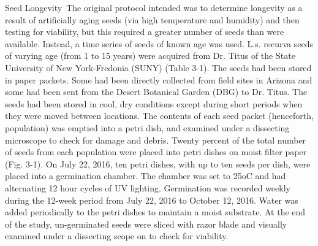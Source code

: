 \documentclass[multicol]{elsarticle}
\begin{document}
\begin{multicols}{2}
\begin{subsection}{Seed Longevity}
\,The original protocol intended was to determine longevity as a result of artificially aging seeds (via high temperature and humidity) and then testing for viability, but this required a greater number of seeds than were available. Instead, a time series of seeds of known age was used. L.s. recurva seeds of varying age (from 1 to 15 years) were acquired from Dr. Titus of the State University of New York-Fredonia (SUNY) (Table 3-1). The seeds had been stored in paper packets. Some had been directly collected from field sites in Arizona and some had been sent from the Desert Botanical Garden (DBG) to Dr. Titus. The seeds had been stored in cool, dry conditions except during short periods when they were moved between locations. The contents of each seed packet (henceforth, population) was emptied into a petri dish, and examined under a dissecting microscope to check for damage and debris. Twenty percent of the total number of seeds from each population were placed into petri dishes on moist filter paper (Fig. 3-1). On July 22, 2016, ten petri dishes, with up to ten seeds per dish, were placed into a germination chamber. The chamber was set to 25oC and had alternating 12 hour cycles of UV lighting. Germination was recorded weekly during the 12-week period from July 22, 2016 to October 12, 2016. Water was added periodically to the petri dishes to maintain a moist substrate. At the end of the study, un-germinated seeds were sliced with razor blade and visually examined under a dissecting scope on to check for viability. 
\end{subsection} 


\end{multicols}
\end{document}
